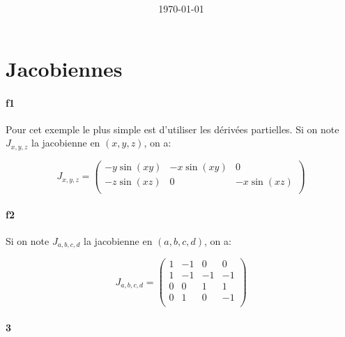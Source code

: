 \documentclass[
10pt, %
a4paper, %
oneside, %
headinclude,footinclude, %
BCOR5mm, %
]{scrartcl}
\title{\normalfont{FTML Exercices 6 solutions}\\
}
\author{\spacedlowsmallcaps{}
}
\date{\today}
\begin{document}
\renewcommand{\sectionmark}[1]{\markright{\spacedlowsmallcaps{#1}}}
\lehead{\mbox{\llap{\small\thepage\kern1em\color{halfgray} \vline}\color{halfgray}\hspace{0.5em}\rightmark\hfil}} 
\pagestyle{scrheadings}
\maketitle 
\setcounter{tocdepth}{3} 

\tableofcontents

\section{\large\color{Blue}Jacobiennes}

\paragraph{f1}%
\label{par:f1}

Pour cet exemple le plus simple est d'utiliser les dérivées partielles. Si on note $J_{x, y, z}$ la jacobienne en $(x, y, z)$, on a:

\begin{equation}
J_{x, y, z} = 
\begin{pmatrix}
    -y\sin(xy) &  -x\sin (xy) & 0\\
    -z\sin(xz) &  0 & -x\sin(xz)\\
\end{pmatrix}
\end{equation}

\paragraph{f2}%
\label{par:f1}

Si on note $J_{a, b, c, d}$ la jacobienne en $(a, b, c, d)$, on a:

\begin{equation}
J_{a, b, c, d} = 
\begin{pmatrix}
    1 &  -1 & 0 & 0 \\
    1 &  -1 & -1 & -1 \\
    0 &  0 & 1 & 1 \\
    0 &  1 & 0 & -1 \\
\end{pmatrix}
\end{equation}


\paragraph{3}%
\label{par:f2}
\end{document}
